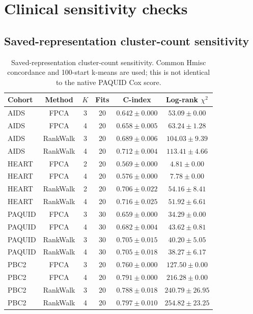 \documentclass[11pt,a4paper]{article}
\begin{document}
\clearpage\section{Clinical sensitivity checks}

\subsection{Saved-representation cluster-count sensitivity}

\begin{table}[htbp]
\centering\small
\caption{Saved-representation cluster-count sensitivity. Common Hmisc concordance and 100-start k-means are used; this is not identical to the native PAQUID Cox score.}
\begin{tabular}{lccccc}\toprule
Cohort & Method & $K$ & Fits & C-index & Log-rank $\chi^2$ \\ \midrule
AIDS & FPCA & 3 & 20 & $0.642 \pm 0.000$ & $53.09 \pm 0.00$ \\
AIDS & FPCA & 4 & 20 & $0.658 \pm 0.005$ & $63.24 \pm 1.28$ \\
AIDS & RankWalk & 3 & 20 & $0.689 \pm 0.006$ & $104.03 \pm 9.39$ \\
AIDS & RankWalk & 4 & 20 & $0.712 \pm 0.004$ & $113.41 \pm 4.66$ \\
HEART & FPCA & 2 & 20 & $0.569 \pm 0.000$ & $4.81 \pm 0.00$ \\
HEART & FPCA & 4 & 20 & $0.576 \pm 0.000$ & $7.78 \pm 0.00$ \\
HEART & RankWalk & 2 & 20 & $0.706 \pm 0.022$ & $54.16 \pm 8.41$ \\
HEART & RankWalk & 4 & 20 & $0.716 \pm 0.025$ & $51.92 \pm 6.61$ \\
PAQUID & FPCA & 3 & 30 & $0.659 \pm 0.000$ & $34.29 \pm 0.00$ \\
PAQUID & FPCA & 4 & 30 & $0.682 \pm 0.004$ & $43.62 \pm 0.81$ \\
PAQUID & RankWalk & 3 & 30 & $0.705 \pm 0.015$ & $40.20 \pm 5.05$ \\
PAQUID & RankWalk & 4 & 30 & $0.705 \pm 0.018$ & $38.27 \pm 6.17$ \\
PBC2 & FPCA & 3 & 20 & $0.760 \pm 0.000$ & $127.50 \pm 0.00$ \\
PBC2 & FPCA & 4 & 20 & $0.791 \pm 0.000$ & $216.28 \pm 0.00$ \\
PBC2 & RankWalk & 3 & 20 & $0.788 \pm 0.018$ & $240.79 \pm 26.95$ \\
PBC2 & RankWalk & 4 & 20 & $0.797 \pm 0.010$ & $254.82 \pm 23.25$ \\
\bottomrule\end{tabular}
\end{table}
\end{document}
